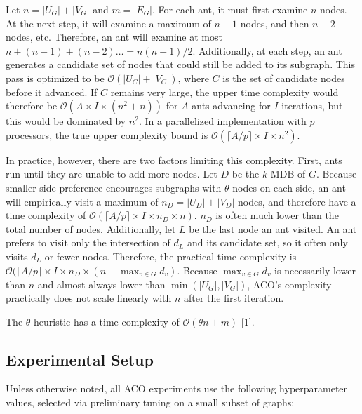 \documentclass{article}
\begin{document}
Let $n = |U_G| + |V_G|$ and $m = |E_G|$. For each ant, it must first examine $n$ nodes. At the next step, it will examine a maximum of $n - 1$ nodes, and then $n - 2$ nodes, etc.
Therefore, an ant will examine at most $n + (n - 1) + (n - 2) \ldots = n(n + 1)/2$. Additionally, at each step, an ant generates a candidate set of nodes that could
still be added to its subgraph. This pass is optimized to be $\mathcal{O}(|U_C| + |V_C|)$, where $C$ is the set of candidate nodes before it advanced. If $C$ remains very large,
the upper time complexity would therefore be $\mathcal{O}(A \times I \times (n^2 + n))$ for $A$ ants advancing for $I$ iterations, but this would be dominated by $n^2$.
In a parallelized implementation with $p$ processors, the true upper complexity bound is $\mathcal{O}(\lceil A / p \rceil \times I \times n^2)$.

In practice, however, there are two factors limiting this complexity. First, ants run until they are unable to add more nodes. Let $D$ be the $k$-MDB of $G$. Because smaller side preference
encourages subgraphs with $\theta$ nodes on each side, an ant will empirically visit a maximum of $n_D = |U_D| + |V_D|$ nodes, and therefore have a time complexity of
$\mathcal{O}(\lceil A / p \rceil \times I \times n_D \times n)$. $n_D$ is often much lower than the total number of nodes. Additionally, let $L$ be the last node an ant visited. An ant prefers to visit only the intersection of $d_L$ and its candidate set, so it often only visits $d_L$ or fewer nodes. Therefore, the practical time complexity is $\mathcal{O}(\lceil A / p \rceil \times I \times n_D \times (n + \max_{v \in G}d_v)$. Because $\max_{v \in G}d_v$ is necessarily lower than $n$ and almost always lower than $\min(|U_G|, |V_G|)$, ACO's complexity practically does not scale linearly with $n$ after the first iteration.

The $\theta$-heuristic has a time complexity of $\mathcal{O}(\theta n + m)$ [1].

\subsection{Experimental Setup}

Unless otherwise noted, all ACO experiments use the following
hyperparameter values, selected via preliminary tuning on a small
subset of graphs:
\end{document}
